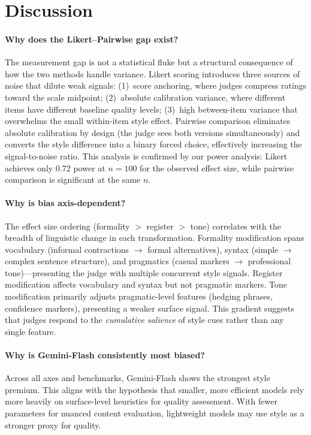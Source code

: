 \documentclass[11pt,a4paper]{article}
\begin{document}
\section{Discussion}

\paragraph{Why does the Likert--Pairwise gap exist?}
The measurement gap is not a statistical fluke but a structural consequence of how the two methods handle variance.
Likert scoring introduces three sources of noise that dilute weak signals: (1)~score anchoring, where judges compress ratings toward the scale midpoint; (2)~absolute calibration variance, where different items have different baseline quality levels; (3)~high between-item variance that overwhelms the small within-item style effect.
Pairwise comparison eliminates absolute calibration by design (the judge sees both versions simultaneously) and converts the style difference into a binary forced choice, effectively increasing the signal-to-noise ratio.
This analysis is confirmed by our power analysis: Likert achieves only 0.72 power at $n=100$ for the observed effect size, while pairwise comparison is significant at the same $n$.

\paragraph{Why is bias axis-dependent?}
The effect size ordering (formality $>$ register $>$ tone) correlates with the breadth of linguistic change in each transformation.
Formality modification spans vocabulary (informal contractions $\to$ formal alternatives), syntax (simple $\to$ complex sentence structure), and pragmatics (casual markers $\to$ professional tone)---presenting the judge with multiple concurrent style signals.
Register modification affects vocabulary and syntax but not pragmatic markers.
Tone modification primarily adjusts pragmatic-level features (hedging phrases, confidence markers), presenting a weaker surface signal.
This gradient suggests that judges respond to the \emph{cumulative salience} of style cues rather than any single feature.

\paragraph{Why is Gemini-Flash consistently most biased?}
Across all axes and benchmarks, Gemini-Flash shows the strongest style premium.
This aligns with the hypothesis that smaller, more efficient models rely more heavily on surface-level heuristics for quality assessment.
With fewer parameters for nuanced content evaluation, lightweight models may use style as a stronger proxy for quality.
\end{document}
